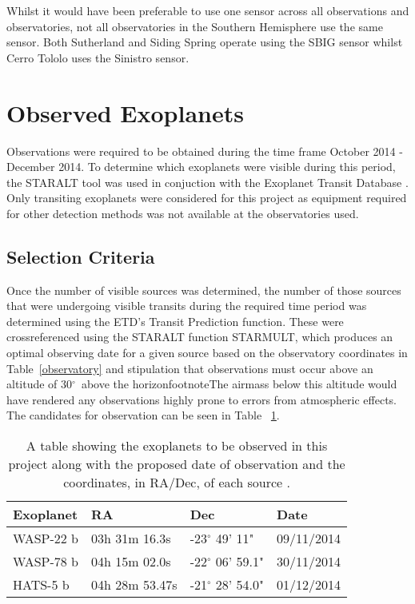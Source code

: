 \documentclass{report}
\begin{document}
Whilst it would have been preferable to use one sensor across all observations and observatories, not all observatories in the Southern Hemisphere use the same sensor. Both Sutherland and Siding Spring operate using the SBIG sensor whilst Cerro Tololo uses the Sinistro sensor.    


\section{Observed Exoplanets}
Observations were required to be obtained during the time frame October 2014 - December 2014. To determine which exoplanets were visible during this period, the STARALT tool \parencite{staralt} was used in conjuction with the Exoplanet Transit Database \parencite{etd}. Only transiting exoplanets were considered for this project as equipment required for other detection methods was not available at the observatories used. 

\subsection{Selection Criteria}
Once the number of visible sources was determined, the number of those sources that were undergoing visible transits during the required time period was determined using the ETD's Transit Prediction function. These were crossreferenced using the STARALT function STARMULT, which produces an optimal observing date for a given source based on the observatory coordinates in Table~\ref{observatory} and stipulation that observations must occur above an altitude of 30$^\circ$\ above the horizonfootnote{The airmass below this altitude would have rendered any observations highly prone to errors from atmospheric effects}. The candidates for observation can be seen in Table ~\ref{planets}.

\begin{table}[H]
    \centering
    \begin{tabular}{ | l | l | l | l | }
    \hline \hline
    Exoplanet & RA & Dec & Date       \\ \hline \hline
    WASP-22 b    & 03h 31m 16.3s & -23$^\circ$ 49' 11" & 09/11/2014 \\
    WASP-78 b   & 04h 15m 02.0s & -22$^\circ$ 06' 59.1" & 30/11/2014 \\
    HATS-5 b  & 04h 28m 53.47s & -21$^\circ$ 28' 54.0" & 01/12/2014 \\
    \hline
    \end{tabular}
    \caption{A table showing the exoplanets to be observed in this project along with the proposed date of observation and the coordinates, in RA/Dec, of each source \parencite{etd}.}
    \label{planets}
\end{table}
\end{document}
